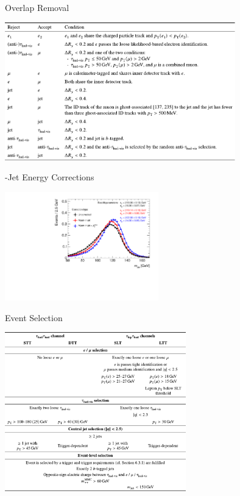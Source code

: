 \documentclass[11pt, xcolor={dvipsnames}, aspectratio=169, notes]{beamer}
\begin{document}

\begin{frame}{Overlap Removal}
  \centering

  \includegraphics[width=0.75\textwidth]{backup/olr}
\end{frame}


\begin{frame}{-Jet Energy Corrections}
  \begin{center}
    \includegraphics[width=0.5\textwidth]{reconstruction/bjet_corrections}
  \end{center}
\end{frame}


\begin{frame}{Event Selection}
  \centering

  \includegraphics[width=0.59\textwidth]{backup/event_selection}
\end{frame}
\end{document}
